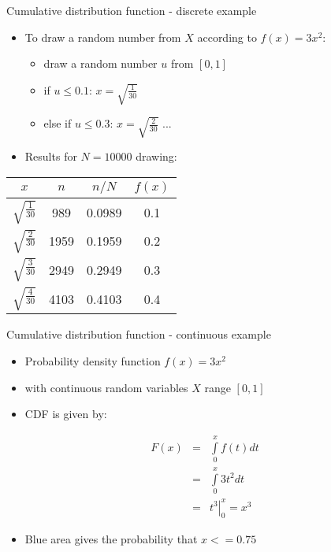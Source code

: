\begin{slide}[toc=]{Cumulative distribution function - discrete example}
\null\vfill
  
 \begin{itemize}
  \item To draw a random number from $X$ according to $f(x) = 3x^2$:
  \begin{itemize}
    \item draw a random number $u$ from $[0, 1]$
    \item if $u \leq 0.1$: $x = \sqrt{\frac{1}{30}}$
    \item else if $u \leq 0.3$: $x = \sqrt{\frac{2}{30}}$ ...
  \end{itemize}
  \item Results for $N = 10000$ drawing:
 \end{itemize}

 \begin{center}
 \begin{tabular}{c|c|c|c}
$x$ & $n$ & $n/N$ & $f(x)$ \\ \hline 
$\sqrt{\frac{1}{30}}$ &  989  & 0.0989 & 0.1 \\
$\sqrt{\frac{2}{30}}$ & 1959 & 0.1959 & 0.2 \\
$\sqrt{\frac{3}{30}}$ & 2949 & 0.2949 & 0.3 \\
$\sqrt{\frac{4}{30}}$ & 4103 & 0.4103 & 0.4 \\
 \end{tabular}
 \end{center}
 
\vfill\null
\end{slide}

\begin{slide}[toc=CDF continuous]{Cumulative distribution function - continuous example}
\null\vfill

  \begin{itemize}
    
    \item Probability density function $f(x) = 3x^2$
    \item[] with continuous random variables $X$ range $[0, 1]$
    \item CDF is given by:
    
  \end{itemize}
  
  \twocolumn
  {
    \begin{eqnarray*}
      F (x) & = & \int\limits_0^x f(t) dt \\
            & = & \int\limits_0^x 3t^2 dt \\
            & = & \left.t^3\right|_0^x = x^3
    \end{eqnarray*}
  }
  {
    
  }
  
  \begin{itemize}
  
    \item Blue area gives the probability that $x <= 0.75$
    
  \end{itemize}

\vfill\null
\end{slide}

